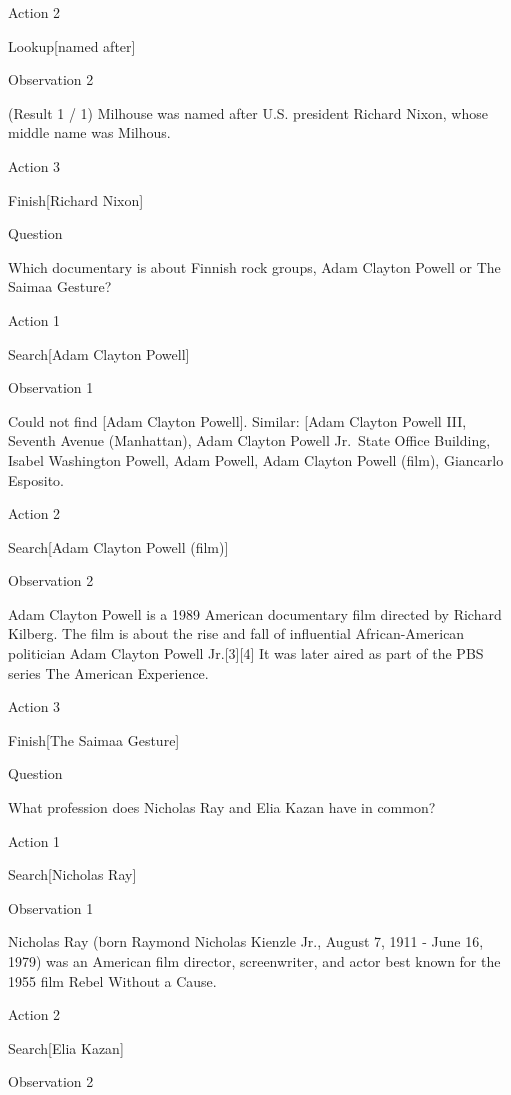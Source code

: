 \documentclass[
]{article}
\begin{document}
Action 2

Lookup{[}named after{]}

Observation 2

(Result 1 / 1) Milhouse was named after U.S. president Richard Nixon,
whose middle name was Milhous.

Action 3

Finish{[}Richard Nixon{]}

Question

Which documentary is about Finnish rock groups, Adam Clayton Powell or
The Saimaa Gesture?

Action 1

Search{[}Adam Clayton Powell{]}

Observation 1

Could not find {[}Adam Clayton Powell{]}. Similar:
{[}\textquotesingle Adam Clayton Powell III\textquotesingle,
\textquotesingle Seventh Avenue (Manhattan)\textquotesingle,
\textquotesingle Adam Clayton Powell Jr.~State Office
Building\textquotesingle, \textquotesingle Isabel Washington
Powell\textquotesingle, \textquotesingle Adam Powell\textquotesingle,
\textquotesingle Adam Clayton Powell (film)\textquotesingle,
\textquotesingle Giancarlo Esposito\textquotesingle{]}.

Action 2

Search{[}Adam Clayton Powell (film){]}

Observation 2

Adam Clayton Powell is a 1989 American documentary film directed by
Richard Kilberg. The film is about the rise and fall of influential
African-American politician Adam Clayton Powell Jr.{[}3{]}{[}4{]} It was
later aired as part of the PBS series The American Experience.

Action 3

Finish{[}The Saimaa Gesture{]}

Question

What profession does Nicholas Ray and Elia Kazan have in common?

Action 1

Search{[}Nicholas Ray{]}

Observation 1

Nicholas Ray (born Raymond Nicholas Kienzle Jr., August 7, 1911 - June
16, 1979) was an American film director, screenwriter, and actor best
known for the 1955 film Rebel Without a Cause.

Action 2

Search{[}Elia Kazan{]}

Observation 2
\end{document}
